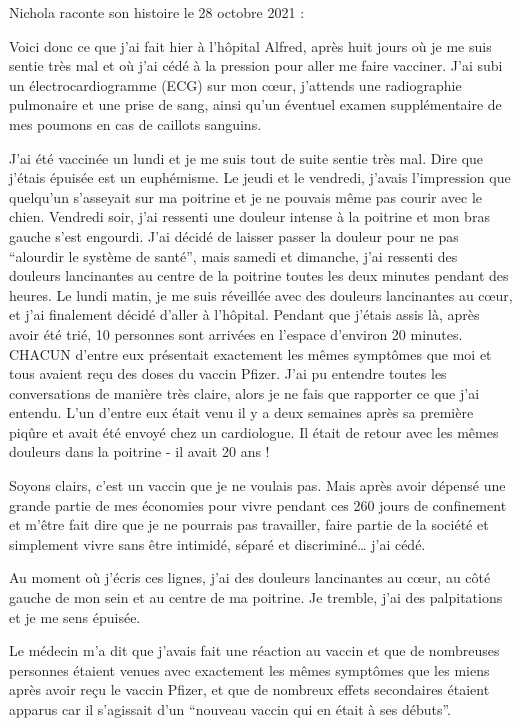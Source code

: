 Nichola raconte son histoire le 28 octobre 2021 :

Voici donc ce que j'ai fait hier à l'hôpital Alfred, après huit jours où je me
suis sentie très mal et où j'ai cédé à la pression pour aller me faire
vacciner. J'ai subi un électrocardiogramme (ECG) sur mon cœur, j'attends une
radiographie pulmonaire et une prise de sang, ainsi qu'un éventuel examen
supplémentaire de mes poumons en cas de caillots sanguins.

J'ai été vaccinée un lundi et je me suis tout de suite sentie très mal. Dire que
j'étais épuisée est un euphémisme. Le jeudi et le vendredi, j'avais l'impression
que quelqu'un s'asseyait sur ma poitrine et je ne pouvais même pas courir avec
le chien. Vendredi soir, j'ai ressenti une douleur intense à la poitrine et mon
bras gauche s'est engourdi. J'ai décidé de laisser passer la douleur pour ne pas
“alourdir le système de santé”, mais samedi et dimanche, j'ai ressenti des
douleurs lancinantes au centre de la poitrine toutes les deux minutes pendant
des heures. Le lundi matin, je me suis réveillée avec des douleurs lancinantes
au cœur, et j'ai finalement décidé d'aller à l'hôpital. Pendant que j'étais
assis là, après avoir été trié, 10 personnes sont arrivées en l'espace d'environ
20 minutes. CHACUN d'entre eux présentait exactement les mêmes symptômes que moi
et tous avaient reçu des doses du vaccin Pfizer. J'ai pu entendre toutes les
conversations de manière très claire, alors je ne fais que rapporter ce que j'ai
entendu. L'un d'entre eux était venu il y a deux semaines après sa première
piqûre et avait été envoyé chez un cardiologue. Il était de retour avec les
mêmes douleurs dans la poitrine - il avait 20 ans !

Soyons clairs, c'est un vaccin que je ne voulais pas. Mais après avoir dépensé
une grande partie de mes économies pour vivre pendant ces 260 jours de
confinement et m'être fait dire que je ne pourrais pas travailler, faire partie
de la société et simplement vivre sans être intimidé, séparé et discriminé… j'ai
cédé.

Au moment où j'écris ces lignes, j'ai des douleurs lancinantes au cœur, au côté
gauche de mon sein et au centre de ma poitrine. Je tremble, j'ai des
palpitations et je me sens épuisée.

Le médecin m'a dit que j'avais fait une réaction au vaccin et que de nombreuses
personnes étaient venues avec exactement les mêmes symptômes que les miens après
avoir reçu le vaccin Pfizer, et que de nombreux effets secondaires étaient
apparus car il s'agissait d'un “nouveau vaccin qui en était à ses débuts”.


